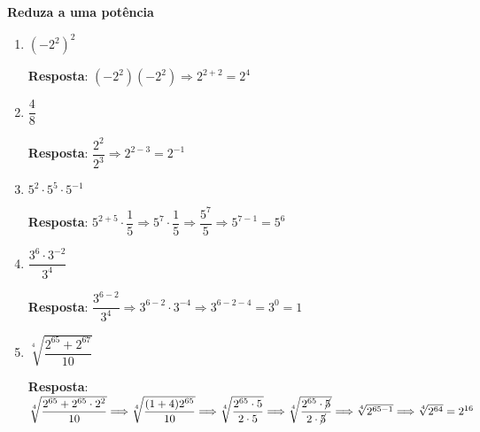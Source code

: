 	\textbf{Reduza a uma potência}
\begin{enumerate}[label=\alph*)]
	
	\item $ (-2^{2})^{2} $
	
	\indent \indent \textbf{Resposta}: $ (-2^{2})(-2^{2}) \Longrightarrow 2^{2+2} = 2^{4} $\\
	
	\item $ \dfrac{4}{8} $
	
	\indent \indent \textbf{Resposta}: $ \dfrac{2^{2}}{2^{3}} \Longrightarrow 2^{2-3} = 2^{-1} $\\
	
	\item $ 5^{2}\cdot 5^{5}\cdot 5^{-1} $
	
	\indent \indent \textbf{Resposta}: $ 5^{2+5} \cdot \dfrac{1}{5} \Longrightarrow 5^{7} \cdot \dfrac{1}{5} \Longrightarrow \dfrac{5^{7}}{5} \Longrightarrow 5^{7-1} = 5^{6} $ \\	
	
	\item $ \dfrac{3^{6}\cdot 3^{-2}}{3^{4}} $
	
	\indent \indent \textbf{Resposta}: $ \dfrac{3^{6-2}}{3^{4}} \Longrightarrow 3^{6 - 2}\cdot 3^{-4} \Longrightarrow 3^{6-2-4} = 3^{0} = 1 $ \\
	
	\item $ \sqrt[4]{\dfrac{2^{65}+2^{67}}{10}} $
	
	\indent \indent \textbf{Resposta}: $ \sqrt[4]{\dfrac{2^{65}+2^{65}\cdot 2^{2}}{10}} \Longrightarrow \sqrt[4]{\dfrac{(1+4)2^{65}}{10}} \Longrightarrow \sqrt[4]{\dfrac{2^{65}\cdot 5}{2\cdot 5}} \Longrightarrow \sqrt[4]{\dfrac{2^{65}\cdot \cancel{5}}{2\cdot \cancel{5}}} \Longrightarrow \sqrt[4]{2^{65-1}} \Longrightarrow \sqrt[4]{2^{64}} = 2^{16} $
	

\end{enumerate}